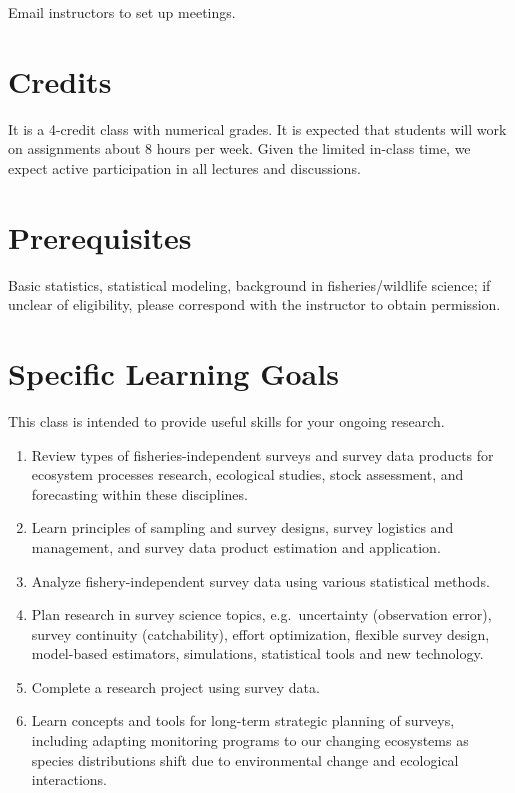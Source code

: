 \documentclass[
  letterpaper,
  oneside,
  open=any]{scrbook}
\providecommand{\tightlist}{%
  \setlength{\itemsep}{0pt}\setlength{\parskip}{0pt}}\usepackage{longtable,booktabs,array}
\begin{document}
Email instructors to set up meetings.

\section{Credits}\label{credits}

It is a 4-credit class with numerical grades. It is expected that
students will work on assignments about 8 hours per week. Given the
limited in-class time, we expect active participation in all lectures
and discussions.

\section{Prerequisites}\label{prerequisites}

Basic statistics, statistical modeling, background in fisheries/wildlife
science; if unclear of eligibility, please correspond with the
instructor to obtain permission.

\section{Specific Learning Goals}\label{specific-learning-goals}

This class is intended to provide useful skills for your ongoing
research.

\begin{enumerate}
\def\labelenumi{\arabic{enumi}.}
\tightlist
\item
  Review types of fisheries-independent surveys and survey data products
  for ecosystem processes research, ecological studies, stock
  assessment, and forecasting within these disciplines.
\item
  Learn principles of sampling and survey designs, survey logistics and
  management, and survey data product estimation and application.
\item
  Analyze fishery-independent survey data using various statistical
  methods.
\item
  Plan research in survey science topics, e.g.~uncertainty (observation
  error), survey continuity (catchability), effort optimization,
  flexible survey design, model-based estimators, simulations,
  statistical tools and new technology.
\item
  Complete a research project using survey data.
\item
  Learn concepts and tools for long-term strategic planning of surveys,
  including adapting monitoring programs to our changing ecosystems as
  species distributions shift due to environmental change and ecological
  interactions.
\end{enumerate}
\end{document}
